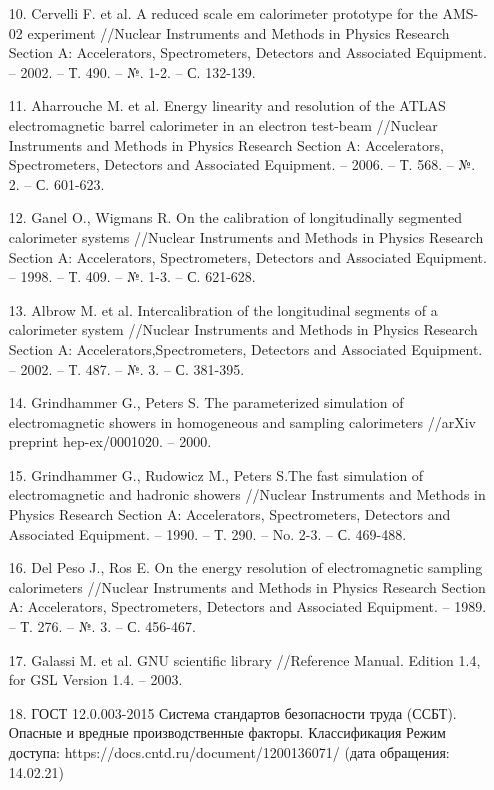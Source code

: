 \begin{itemize}[leftmargin=1.6\parindent, wide]
\item[10.] Cervelli F. et al. A reduced scale em calorimeter prototype for the AMS-02 experiment //Nuclear Instruments and Methods in Physics Research Section A: Accelerators, Spectrometers, Detectors and Associated Equipment. – 2002. – Т. 490. – №. 1-2. – С. 132-139.
\item[11.] Aharrouche M. et al. Energy linearity and resolution of the ATLAS electromagnetic barrel calorimeter in an electron test-beam //Nuclear Instruments and Methods in Physics Research Section A: Accelerators, Spectrometers, Detectors and Associated Equipment. – 2006. – Т. 568. – №. 2. – С. 601-623.
\item[12.] Ganel O., Wigmans R. On the calibration of longitudinally segmented calorimeter systems //Nuclear Instruments and Methods in Physics Research Section A: Accelerators, Spectrometers, Detectors and Associated Equipment. – 1998. – Т. 409. – №. 1-3. – С. 621-628.
\item[13.] Albrow  M.  et  al.  Intercalibration  of  the  longitudinal  segments  of  a calorimeter   system   //Nuclear   Instruments   and   Methods   in   Physics   Research Section  A:  Accelerators,Spectrometers,  Detectors  and  Associated  Equipment. – 2002. – Т. 487. – №. 3. – С. 381-395.
\item[14.] Grindhammer G., Peters S. The parameterized simulation of electromagnetic showers in homogeneous and sampling calorimeters //arXiv preprint hep-ex/0001020. – 2000.
\item[15.] Grindhammer  G.,  Rudowicz  M.,  Peters  S.The  fast  simulation  of electromagnetic  and  hadronic  showers  //Nuclear  Instruments  and  Methods  in Physics   Research   Section   A:   Accelerators,   Spectrometers,   Detectors   and Associated Equipment. – 1990. – Т. 290. – No. 2-3. – С. 469-488.
\item[16.] Del Peso J., Ros E. On the energy resolution of electromagnetic sampling calorimeters //Nuclear Instruments and Methods in Physics Research Section A: Accelerators, Spectrometers, Detectors and Associated Equipment. – 1989. – Т. 276. – №. 3. – С. 456-467.
\item[17.] Galassi M. et al. GNU scientific library //Reference Manual. Edition 1.4, for GSL Version 1.4. – 2003.
\item[18.] ГОСТ  12.0.003-2015  Система  стандартов  безопасности  труда  (ССБТ). Опасные  и  вредные  производственные  факторы.  Классификация Режим доступа: https://docs.cntd.ru/document/1200136071/ (дата обращения: 14.02.21)

\end{itemize}
